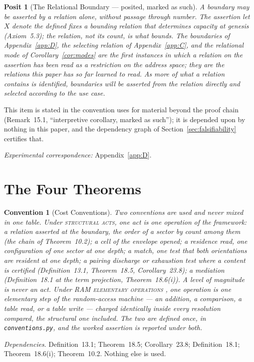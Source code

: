 \documentclass[pdflatex,sn-mathphys-num]{sn-jnl}
\theoremstyle{thmstyleone}%
\newtheorem{convention}[theorem]{Convention}
\newtheorem{posit}[theorem]{Posit}
\theoremstyle{thmstyletwo}%
\theoremstyle{thmstylethree}%
\newtheorem{convention}[theorem]{Convention}
\newtheorem{posit}[theorem]{Posit}
\newcommand{\PA}{\cite{Swanagon2026PA}}
\newcommand{\q}[1]{``#1''}        %
\newcommand{\deps}[1]{\par\begin{sloppypar}\noindent\emph{Dependencies.} #1 Nothing else is used.\end{sloppypar}}
\begin{document}
\begin{table}[!htbp]
\centering\small
\caption{The two modes of assertion (Protocol~D.7): the stratifier recovered from counts by Theorem~20.2 with every subtraction charged, against the stratifier read from the asserted tree.}
\label{tab:modes}

\end{table}

\begin{posit}[The Relational Boundary --- posited, marked as such]\label{pos:relational}
A boundary may be asserted by a relation alone, without passage through number. The assertion \emph{let $X$ denote the defined} fixes a bounding relation that determines capacity at genesis (Axiom~5.3); the relation, not its count, is what bounds. The boundaries of Appendix~\ref{app:D}, the selecting relation of Appendix~\ref{app:C}, and the relational mode of Corollary~\ref{cor:modes} are the first instances in which a relation on the assertion has been read as a restriction on the address space; they are the relations this paper has so far learned to read. As more of what a relation contains is identified, boundaries will be asserted from the relation directly and selected according to the use case.
\end{posit}
\noindent This item is stated in the convention \PA{} uses for material beyond the proof chain (Remark~15.1, \q{interpretive corollary, marked as such}); it is depended upon by nothing in this paper, and the dependency graph of Section~\ref{sec:falsifiability} certifies that.

\noindent\emph{Experimental correspondence:} Appendix~\ref{app:D}.

\section{The Four Theorems}\label{sec:theorems}

\begin{convention}[Cost Conventions]\label{conv:cost}
Two conventions are used and never mixed in one table. Under \textsc{structural acts}, one act is one operation of the framework: a relation asserted at the boundary, the order of a sector by count among them (the chain of Theorem~10.2); a cell of the envelope opened; a residence read, one configuration of one sector at one depth; a match, one test that both orientations are resident at one depth; a pairing discharge or exhaustion test where a content is certified (Definition~13.1, Theorem~18.5, Corollary~23.8); a mediation (Definition~18.1 at the term projection, Theorem~18.6(i)). A level of magnitude is never an act. Under \textsc{RAM elementary operations} \citep{CookReckhow1973}, one operation is one elementary step of the random-access machine --- an addition, a comparison, a table read, or a table write --- charged identically inside every resolution compared, the structural one included. The two are defined once, in \texttt{conventions.py}, and the worked assertion is reported under both.
\end{convention}
\deps{Definition~13.1; Theorem~18.5; Corollary~23.8; Definition~18.1; Theorem~18.6(i); Theorem~10.2.}
\end{document}
